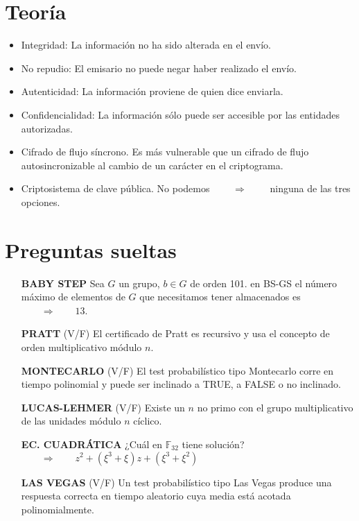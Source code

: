 \documentclass[fleqn]{article}
\def\F{\mathds{F}}
\def\next{\qquad \Rightarrow \qquad}
\begin{document}
    \section{Teoría}
    \begin{itemize}
        \item Integridad: La información no ha sido alterada en el envío.
        \item No repudio: El emisario no puede negar haber realizado el envío.
        \item Autenticidad: La información proviene de quien dice enviarla.
        \item Confidencialidad: La información sólo puede ser accesible por las entidades autorizadas.
        \item Cifrado de flujo síncrono. Es más vulnerable que un cifrado de flujo autosincronizable al cambio de un carácter en el criptograma.
        \item Criptosistema de clave pública. No podemos $\next$ ninguna de las tres opciones.
    \end{itemize}

    \section{Preguntas sueltas}
    \begin{itemize}
        \item[\textbf{BABY STEP}] Sea $G$ un grupo, $b \in G$ de orden 101. en BS-GS el número máximo de elementos de $G$ que necesitamos tener almacenados es $\next 13$.
        \item[\textbf{PRATT}]  (V/F) El certificado de Pratt es recursivo y usa el concepto de orden multiplicativo módulo $n$.
        \item[\textbf{MONTECARLO}] (V/F) El test probabilístico tipo Montecarlo corre en tiempo polinomial y puede ser inclinado a TRUE, a FALSE o no inclinado.
        \item[\textbf{LUCAS-LEHMER}] (V/F) Existe un $n$ no primo con el grupo multiplicativo de las unidades módulo $n$ cíclico.
        \item[\textbf{EC. CUADRÁTICA}] ¿Cuál en $\F_{32}$ tiene solución? $\next z^2 + (\xi^3 + \xi)z + (\xi^3 + \xi^2)$ 
        \item[\textbf{LAS VEGAS}] (V/F) Un test probabilístico tipo Las Vegas produce una respuesta correcta en tiempo aleatorio cuya media está acotada polinomialmente.
    \end{itemize}
\end{document}
